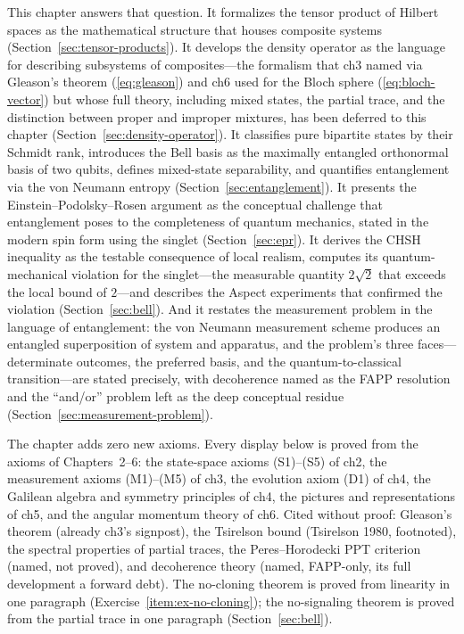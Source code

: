 This chapter answers that question. It formalizes the tensor product of Hilbert spaces as the mathematical structure that houses composite systems (Section~\ref{sec:tensor-products}). It develops the density operator as the language for describing subsystems of composites---the formalism that ch3 named via Gleason's theorem (\eqref{eq:gleason}) and ch6 used for the Bloch sphere (\eqref{eq:bloch-vector}) but whose full theory, including mixed states, the partial trace, and the distinction between proper and improper mixtures, has been deferred to this chapter (Section~\ref{sec:density-operator}). It classifies pure bipartite states by their Schmidt rank, introduces the Bell basis as the maximally entangled orthonormal basis of two qubits, defines mixed-state separability, and quantifies entanglement via the von Neumann entropy (Section~\ref{sec:entanglement}). It presents the Einstein--Podolsky--Rosen argument as the conceptual challenge that entanglement poses to the completeness of quantum mechanics, stated in the modern spin form using the singlet (Section~\ref{sec:epr}). It derives the CHSH inequality as the testable consequence of local realism, computes its quantum-mechanical violation for the singlet---the measurable quantity $2\sqrt{2}$ that exceeds the local bound of $2$---and describes the Aspect experiments that confirmed the violation (Section~\ref{sec:bell}). And it restates the measurement problem in the language of entanglement: the von Neumann measurement scheme produces an entangled superposition of system and apparatus, and the problem's three faces---determinate outcomes, the preferred basis, and the quantum-to-classical transition---are stated precisely, with decoherence named as the FAPP resolution and the ``and/or'' problem left as the deep conceptual residue (Section~\ref{sec:measurement-problem}).

The chapter adds zero new axioms. Every display below is proved from the axioms of Chapters~2--6: the state-space axioms (S1)--(S5) of ch2, the measurement axioms (M1)--(M5) of ch3, the evolution axiom (D1) of ch4, the Galilean algebra and symmetry principles of ch4, the pictures and representations of ch5, and the angular momentum theory of ch6. Cited without proof: Gleason's theorem (already ch3's signpost), the Tsirelson bound (Tsirelson 1980, footnoted), the spectral properties of partial traces, the Peres--Horodecki PPT criterion (named, not proved), and decoherence theory (named, FAPP-only, its full development a forward debt). The no-cloning theorem is proved from linearity in one paragraph (Exercise~\ref{item:ex-no-cloning}); the no-signaling theorem is proved from the partial trace in one paragraph (Section~\ref{sec:bell}).


